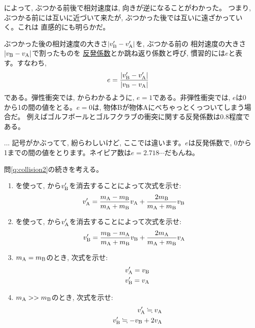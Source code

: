 によって, ぶつかる前後で相対速度は, 向きが逆になることがわかった。
つまり, ぶつかる前には互いに近づいて来たが, ぶつかった後では互いに遠ざかっていく。これは
直感的にも明らかだ。

ぶつかった後の相対速度の大きさ$|v'_{\text B}-v'_{\text A}|$を, ぶつかる前の
相対速度の大きさ$|v_{\text B}-v_{\text A}|$で割ったものを
\underline{反発係数}とか跳ね返り係数と呼び, 慣習的には$e$と表す。すなわち, 
\begin{eqnarray}
e=\frac{|v'_{\text B}-v'_{\text A}|}{|v_{\text B}-v_{\text A}|}\label{eq:collision_coeff}
\end{eqnarray}
である。弾性衝突では, 
からわかるように, $e=1$である。非弾性衝突では, 
$e$は0から1の間の値をとる。$e=0$は, 物体Bが物体Aにべちゃっとくっついてしまう場合だ。
例えばゴルフボールとゴルフクラブの衝突に関する反発係数は0.8程度である。\mv

\begin{faq}{\small{}
... 記号がかぶってて, 紛らわしいけど, ここでは違います。$e$は反発係数で, 
0から1までの間の値をとります。ネイピア数は$e=2.718\cdots$だもんね。}\end{faq}\mv

\begin{q}\label{q:collision2_contin} 問\ref{q:collision2}の続きを考える。
\begin{enumerate}
\item {}を使って, から$v'_{\text B}$を消去することによって次式を示せ:
\begin{eqnarray}
v'_{\text A}=\frac{m_{\text A}-m_{\text B}}{m_{\text A}+m_{\text B}}v_{\text A}+\frac{2m_{\text B}}{m_{\text A}+m_{\text B}}v_{\text B}\label{eq:collision2_15}
\end{eqnarray}
\item {}を使って, から$v'_{\text A}$を消去することによって次式を示せ:
\begin{eqnarray}
v'_{\text B}=\frac{m_{\text B}-m_{\text A}}{m_{\text A}+m_{\text B}}v_{\text B}+\frac{2m_{\text A}}{m_{\text A}+m_{\text B}}v_{\text A}\label{eq:collision2_17}
\end{eqnarray}
\item $m_{\text A}=m_{\text B}$のとき, 次式を示せ:
\begin{eqnarray}
&&v'_{\text A}=v_{\text B}\label{eq:collision2_21}\\
&&v'_{\text B}=v_{\text A}\label{eq:collision2_23}
\end{eqnarray}
\item $m_{\text A}>>m_{\text B}$のとき, 次式を示せ:
\begin{eqnarray}
&&v'_{\text A}\fallingdotseq v_{\text A}\label{eq:collision2_25}\\
&&v'_{\text B}\fallingdotseq -v_{\text B}+2v_{\text A}\label{eq:collision2_27}
\end{eqnarray}
\end{enumerate}
\end{q}
\vspace{0.2cm}

